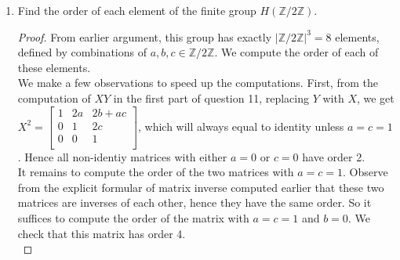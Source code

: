 \documentclass{article}
\begin{document}
\begin{enumerate}
\begin{enumerate}
\begin{enumerate}
\begin{proof}
              It remains to show that associativity holds for the element
              in row 1 column 3. Let $Z =
                \begin{bmatrix}
                  1 & g & h \\
                  0 & 1 & i \\
                  0 & 0 & 1 \\
                \end{bmatrix}$.
              Then for the element in the top right position, $(XY)Z$ gives
              $b+e+af+h+(a+d)i$, while $X(YZ)$ gives $b+(e+h+di)+a(f+i)$,
              which are equal. Hence multiplication is associative. \\

              Since $H(F)$ is closed, associative, contains the unit, and
              inverses, it is a group. The order of $H(F)$ is $|F|^3$, for
              each combination of the three variables $a,b,c\in F$. 
            \end{proof}
          \item Find the order of each element of the finite group
            $H(\mathbb{Z}/2\mathbb{Z})$.
            \begin{proof}
              From earlier argument, this group has exactly
              $|\mathbb{Z}/2\mathbb{Z}|^3=8$ elements, defined by
              combinations of $a,b,c\in\mathbb{Z}/2\mathbb{Z}$. We compute
              the order of each of these elements. \\
              
              We make a few observations to speed up the computations.
              First, from the computation of $XY$ in the first part of
              question 11, replacing $Y$ with $X$, we get $X^2 =
                \begin{bmatrix}
                  1 & 2a  & 2b+ac \\
                  0 & 1   & 2c \\
                  0 & 0   & 1 \\
                \end{bmatrix} $,
              which will always equal to identity unless $a=c=1$. Hence all
              non-identiy matrices with either $a=0$ or $c=0$ have order 2.
              \\

              It remains to compute the order of the two matrices with
              $a=c=1$. Observe from the explicit formular of matrix inverse
              computed earlier that these two matrices are inverses of each
              other, hence they have the same order. So it suffices to
              compute the order of the matrix with $a=c=1$ and $b=0$. We
              check that this matrix has order 4. \\


\end{proof}
\end{enumerate}
\end{enumerate}
\end{enumerate}
\end{document}
